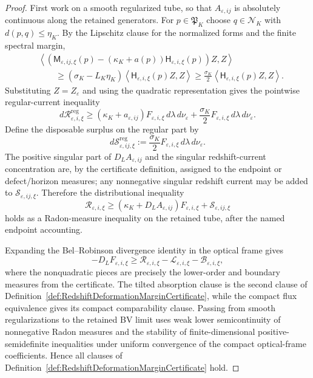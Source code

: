 \begin{proof}
First work on a smooth regularized tube, so that $A_{\varepsilon,ij}$ is
absolutely continuous along the retained generators.  For
$p\in\mathfrak P_K$ choose $q\in\mathcal N_K$ with $d(p,q)\le\eta_K$.  By the
Lipschitz clause for the normalized forms and the finite spectral margin,
\[
\begin{split}
    &\left\langle
    \left(
        \mathsf M_{\varepsilon,ij,\xi}(p)
        -
        (\kappa_K+a(p))\mathsf H_{\varepsilon,i,\xi}(p)
    \right)Z,Z
    \right\rangle  \\
    &\qquad\ge
    (\sigma_K-L_K\eta_K)
    \left\langle
    \mathsf H_{\varepsilon,i,\xi}(p)Z,Z
    \right\rangle
    \ge
    \frac{\sigma_K}{2}
    \left\langle
    \mathsf H_{\varepsilon,i,\xi}(p)Z,Z
    \right\rangle .
\end{split}
\]
Substituting $Z=Z_\varepsilon$ and using the quadratic representation gives the
pointwise regular-current inequality
\[
    d\mathcal R^{\mathrm{reg}}_{\varepsilon,i,\xi}
    \ge
    (\kappa_K+a_{\varepsilon,ij})
    F_{\varepsilon,i,\xi}\,d\lambda\,d\nu_\varepsilon
    +
    \frac{\sigma_K}{2}F_{\varepsilon,i,\xi}\,d\lambda\,d\nu_\varepsilon .
\]
Define the disposable surplus on the regular part by
\[
    d\mathcal S_{\varepsilon,ij,\xi}^{\mathrm{reg}}
    :=
    \frac{\sigma_K}{2}F_{\varepsilon,i,\xi}\,d\lambda\,d\nu_\varepsilon .
\]
The positive singular part of $D_LA_{\varepsilon,ij}$ and the singular
redshift-current concentration are, by the certificate definition, assigned to
the endpoint or defect/horizon measures; any nonnegative singular redshift
current may be added to $\mathcal S_{\varepsilon,ij,\xi}$.  Therefore the
distributional inequality
\[
    \mathcal R_{\varepsilon,i,\xi}
    \ge
    \left(\kappa_K+D_LA_{\varepsilon,ij}\right)
    F_{\varepsilon,i,\xi}
    +
    \mathcal S_{\varepsilon,ij,\xi}
\]
holds as a Radon-measure inequality on the retained tube, after the named
endpoint accounting.

Expanding the Bel--Robinson divergence identity in the optical frame gives
\[
    -D_LF_{\varepsilon,i,\xi}
    \ge
    \mathcal R_{\varepsilon,i,\xi}
    -
    \mathcal L_{\varepsilon,i,\xi}
    -
    \mathcal B_{\varepsilon,i,\xi},
\]
where the nonquadratic pieces are precisely the lower-order and boundary
measures from the certificate.  The tilted absorption clause is the second
clause of Definition~\ref{def:RedshiftDeformationMarginCertificate}, while the
compact flux equivalence gives its compact comparability clause.  Passing from
smooth regularizations to the retained BV limit uses weak lower semicontinuity
of nonnegative Radon measures and the stability of finite-dimensional
positive-semidefinite inequalities under uniform convergence of the compact
optical-frame coefficients.  Hence all clauses of
Definition~\ref{def:RedshiftDeformationMarginCertificate} hold.
\end{proof}


